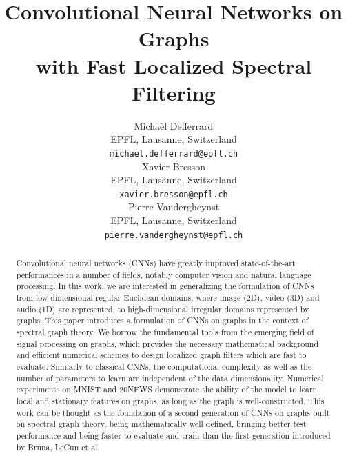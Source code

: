 \documentclass{article}
\title{Convolutional Neural Networks on Graphs\\
with Fast Localized Spectral Filtering}
\author{
  Michaël Defferrard \\ %
  EPFL, Lausanne, Switzerland \\
  \texttt{michael.defferrard@epfl.ch} \\
  \And %
  Xavier Bresson \\
  EPFL, Lausanne, Switzerland \\
  \texttt{xavier.bresson@epfl.ch} \\
  \And %
  Pierre Vandergheynst \\
  EPFL, Lausanne, Switzerland \\
  \texttt{pierre.vandergheynst@epfl.ch} \\
}
\begin{document}
\maketitle

\begin{abstract}

	Convolutional neural networks (CNNs) have greatly improved state-of-the-art
	performances in a number of fields, notably computer vision and natural
	language processing. In this work, we are interested in generalizing the
	formulation of CNNs from low-dimensional regular Euclidean domains, where
	image (2D), video (3D) and audio (1D) are represented, to high-dimensional
	irregular domains represented by graphs. This paper introduces a formulation
	of CNNs on graphs in the context of spectral graph theory. We borrow the
	fundamental tools from the emerging field of signal processing on graphs,
	which provides the necessary mathematical background and efficient numerical
	schemes to design localized graph filters which are fast to evaluate.
	Similarly to classical CNNs, the computational complexity as well as the
	number of parameters to learn are independent of the data dimensionality.
	Numerical experiments on MNIST and 20NEWS demonstrate the ability of the
	model to learn local and stationary features on graphs, as long as the graph
	is well-constructed. This work can be thought as the foundation of a second
	generation of CNNs on graphs built on spectral graph theory, being
	mathematically well defined, bringing better test performance and being
	faster to evaluate and train than the first generation introduced by Bruna,
	LeCun et al.


	
\end{abstract}

\end{document}
